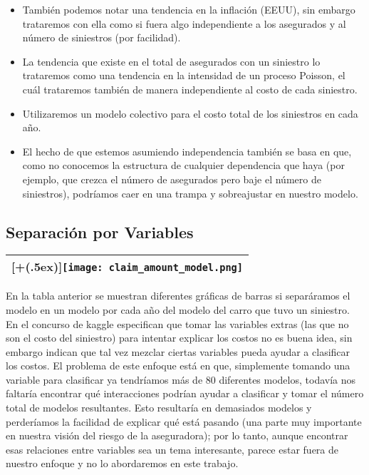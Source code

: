 \documentclass[DIV=calc, 
					paper=letter, 
					fontsize=11pt, 
					twocolumn]{scrartcl}
\newcommand*{\addheight}[2][.5ex]{%
  \raisebox{0pt}[\dimexpr\height+(#1)\relax]{#2}%
}
\begin{document}
\begin{itemize}
\item Tambi\'en podemos notar una tendencia en la inflaci\'on (EEUU), sin embargo trataremos con ella como si fuera algo independiente a los asegurados y al n\'umero de siniestros (por facilidad).
\item La tendencia que existe en el total de asegurados con un siniestro lo trataremos como una tendencia en la intensidad de un proceso Poisson, el cu\'al trataremos tambi\'en de manera independiente al costo de cada siniestro.
\item Utilizaremos un modelo colectivo para el costo total de los siniestros en cada a\~{n}o.
\item El hecho de que estemos asumiendo independencia tambi\'en se basa en que, como no conocemos la estructura de cualquier dependencia que haya (por ejemplo, que crezca el n\'umero de asegurados pero baje el n\'umero de siniestros), podr\'iamos caer en una trampa y sobreajustar en nuestro modelo.
\end{itemize}



\subsection{Separaci\'on por Variables}
\begin{tabular}{|c|}
	\hline
  	\addheight{\texttt{[image: claim\_amount\_model.png]}}\\
	\hline
\end{tabular}
\noindent En la tabla anterior se muestran diferentes gr\'aficas de barras si separ\'aramos el modelo en un modelo por cada a\~{n}o del modelo del carro que tuvo un siniestro. En el concurso de kaggle especifican que tomar las variables extras (las que no son el costo del siniestro) para intentar explicar los costos no es buena idea, sin embargo indican que tal vez mezclar ciertas variables pueda ayudar a clasificar los costos. El problema de este enfoque est\'a en que, simplemente tomando una variable para clasificar ya tendr\'iamos m\'as de 80 diferentes modelos, todav\'ia nos faltar\'ia encontrar qu\'e interacciones podr\'ian ayudar a clasificar y tomar el n\'umero total de modelos resultantes. Esto resultar\'ia en demasiados modelos y perder\'iamos la facilidad de explicar qu\'e est\'a pasando (una parte muy importante en nuestra visi\'on del riesgo de la aseguradora); por lo tanto, aunque encontrar esas relaciones entre variables sea un tema interesante, parece estar fuera de nuestro enfoque y no lo abordaremos en este trabajo.
\end{document}
